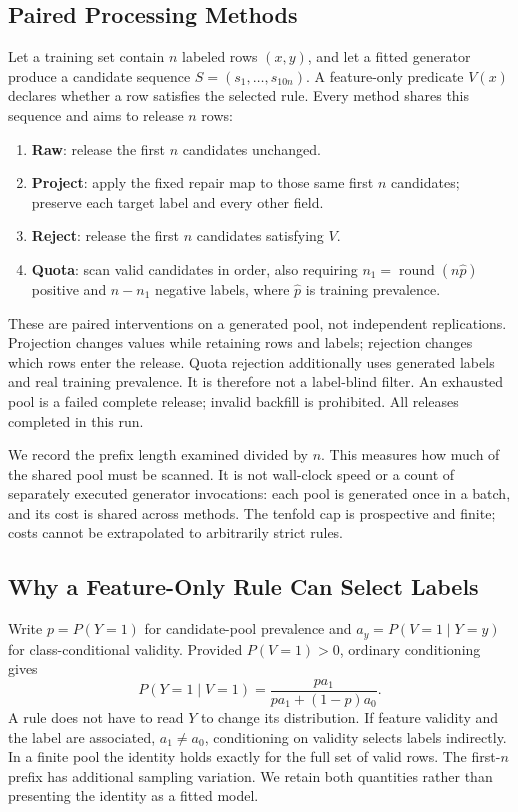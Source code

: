 \documentclass{svproc}
\begin{document}
\subsection{Paired Processing Methods}
Let a training set contain $n$ labeled rows $(x,y)$, and let a fitted generator produce a candidate sequence $S=(s_1,\ldots,s_{10n})$. A feature-only predicate $V(x)$ declares whether a row satisfies the selected rule. Every method shares this sequence and aims to release $n$ rows:
\begin{enumerate}
\item \textbf{Raw}: release the first $n$ candidates unchanged.
\item \textbf{Project}: apply the fixed repair map to those same first $n$ candidates; preserve each target label and every other field.
\item \textbf{Reject}: release the first $n$ candidates satisfying $V$.
\item \textbf{Quota}: scan valid candidates in order, also requiring $n_1=\operatorname{round}(n\hat p)$ positive and $n-n_1$ negative labels, where $\hat p$ is training prevalence.
\end{enumerate}
These are paired interventions on a generated pool, not independent replications. Projection changes values while retaining rows and labels; rejection changes which rows enter the release. Quota rejection additionally uses generated labels and real training prevalence. It is therefore not a label-blind filter. An exhausted pool is a failed complete release; invalid backfill is prohibited. All releases completed in this run.

We record the prefix length examined divided by $n$. This measures how much of the shared pool must be scanned. It is not wall-clock speed or a count of separately executed generator invocations: each pool is generated once in a batch, and its cost is shared across methods. The tenfold cap is prospective and finite; costs cannot be extrapolated to arbitrarily strict rules.

\subsection{Why a Feature-Only Rule Can Select Labels}
Write $p=P(Y=1)$ for candidate-pool prevalence and $a_y=P(V=1\mid Y=y)$ for class-conditional validity. Provided $P(V=1)>0$, ordinary conditioning gives
\begin{equation}
P(Y=1\mid V=1)=\frac{p a_1}{p a_1+(1-p)a_0}.\label{eq:selection}
\end{equation}
A rule does not have to read $Y$ to change its distribution. If feature validity and the label are associated, $a_1\ne a_0$, conditioning on validity selects labels indirectly. In a finite pool the identity holds exactly for the full set of valid rows. The first-$n$ prefix has additional sampling variation. We retain both quantities rather than presenting the identity as a fitted model.
\end{document}
